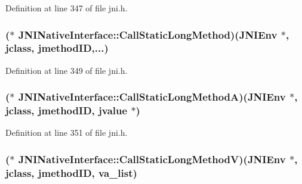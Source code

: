 Definition at line 347 of file jni.\-h.

\hypertarget{struct_j_n_i_native_interface_a4d84a0309ddfa54a89392ff2591ac18b}{
\subsubsection[{Call\-Static\-Long\-Method}]{($\ast$ J\-N\-I\-Native\-Interface\-::\-Call\-Static\-Long\-Method)({\bf J\-N\-I\-Env} $\ast$, {\bf jclass}, {\bf jmethod\-I\-D},...)}}\label{struct_j_n_i_native_interface_a4d84a0309ddfa54a89392ff2591ac18b}


Definition at line 349 of file jni.\-h.

\hypertarget{struct_j_n_i_native_interface_afd4eb370023846369378bcd3e0510098}{
\subsubsection[{Call\-Static\-Long\-Method\-A}]{($\ast$ J\-N\-I\-Native\-Interface\-::\-Call\-Static\-Long\-Method\-A)({\bf J\-N\-I\-Env} $\ast$, {\bf jclass}, {\bf jmethod\-I\-D}, {\bf jvalue} $\ast$)}}\label{struct_j_n_i_native_interface_afd4eb370023846369378bcd3e0510098}


Definition at line 351 of file jni.\-h.

\hypertarget{struct_j_n_i_native_interface_ad2714848736ad084ad35ec37ae7bfebf}{
\subsubsection[{Call\-Static\-Long\-Method\-V}]{($\ast$ J\-N\-I\-Native\-Interface\-::\-Call\-Static\-Long\-Method\-V)({\bf J\-N\-I\-Env} $\ast$, {\bf jclass}, {\bf jmethod\-I\-D}, va\-\_\-list)}}\label{struct_j_n_i_native_interface_ad2714848736ad084ad35ec37ae7bfebf}


